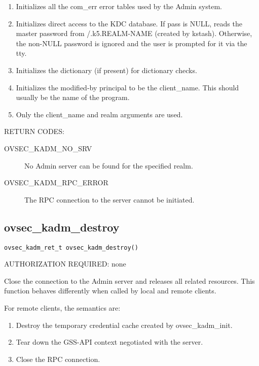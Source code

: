 \begin{enumerate}
\item Initializes all the com_err error tables used by the Admin
system.

\item Initializes direct access to the KDC database.  If pass is NULL,
reads the master password from /.k5.REALM-NAME (created by kstash).
Otherwise, the non-NULL password is ignored and the user is prompted
for it via the tty.

\item Initializes the dictionary (if present) for dictionary checks.

\item Initializes the modified-by principal to be the client_name.
This should usually be the name of the program.

\item Only the client_name and realm arguments are used.
\end{enumerate}

RETURN CODES: 

\begin{description}
\item[OVSEC_KADM_NO_SRV] No Admin server can be found for the
specified realm.

\item[OVSEC_KADM_RPC_ERROR] The RPC connection to the server cannot be
initiated.
\end{description}

\subsection{ovsec_kadm_destroy}

\begin{verbatim}
ovsec_kadm_ret_t ovsec_kadm_destroy()
\end{verbatim}

AUTHORIZATION REQUIRED: none

Close the connection to the Admin server and releases all related
resources.  This function behaves differently when called by local and
remote clients.

For remote clients, the semantics are:

\begin{enumerate}
\item Destroy the temporary credential cache created by
ovsec_kadm_init.

\item Tear down the GSS-API context negotiated with the server.

\item Close the RPC connection.
\end{enumerate}

